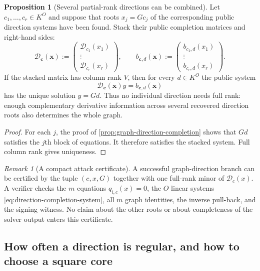 \documentclass[11pt,a4paper]{article}
\theoremstyle{definition}
\newtheorem{proposition}[theorem]{Proposition}
\theoremstyle{remark}
\newtheorem{remark}[theorem]{Remark}
\begin{document}
\begin{proposition}[Several partial-rank directions can be combined]\label{prop:multi-direction-completion}
Let $c_1,\ldots,c_r\in K^O$ and suppose that roots $x_j=Gc_j$ of the corresponding public direction systems have been found.  Stack their public completion matrices and right-hand sides:
\[
 \mathcal D_{\boldsymbol c}(\boldsymbol x)
 :=\begin{pmatrix}\mathcal D_{c_1}(x_1)\\ \vdots\\ \mathcal D_{c_r}(x_r)\end{pmatrix},
 \qquad
 b_{\boldsymbol c,d}(\boldsymbol x)
 :=\begin{pmatrix}b_{c_1,d}(x_1)\\ \vdots\\ b_{c_r,d}(x_r)\end{pmatrix}.
\]
If the stacked matrix has column rank $V$, then for every $d\in K^O$ the public system
\[
 \mathcal D_{\boldsymbol c}(\boldsymbol x)y=b_{\boldsymbol c,d}(\boldsymbol x)
\]
has the unique solution $y=Gd$.  Thus no individual direction needs full rank: enough complementary derivative information across several recovered direction roots also determines the whole graph.
\end{proposition}

\begin{proof}
For each $j$, the proof of \cref{prop:graph-direction-completion} shows that $Gd$ satisfies the $j$th block of equations.  It therefore satisfies the stacked system.  Full column rank gives uniqueness.
\end{proof}

\begin{remark}[A compact attack certificate]\label{rem:graph-certificate}
A successful graph-direction branch can be certified by the tuple $(c,x,G)$ together with one full-rank minor of $\mathcal D_c(x)$.  A verifier checks the $m$ equations $q_{i,c}(x)=0$, the $O$ linear systems \eqref{eq:direction-completion-system}, all $m$ graph identities, the inverse pull-back, and the signing witness.  No claim about the other roots or about completeness of the solver output enters this certificate.
\end{remark}

\subsection{How often a direction is regular, and how to choose a square core}
\end{document}
